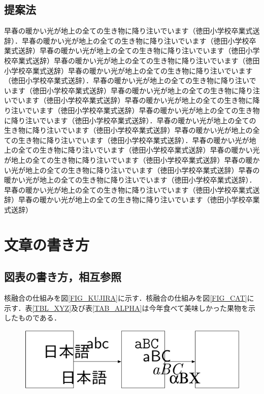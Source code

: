 \begin{multicols*}{2}
\subsection{提案法}
早春の暖かい光が地上の全ての生き物に降り注いでいます（徳田小学校卒業式送辞）．早春の暖かい光が地上の全ての生き物に降り注いでいます（徳田小学校卒業式送辞）早春の暖かい光が地上の全ての生き物に降り注いでいます（徳田小学校卒業式送辞）早春の暖かい光が地上の全ての生き物に降り注いでいます（徳田小学校卒業式送辞）早春の暖かい光が地上の全ての生き物に降り注いでいます（徳田小学校卒業式送辞）．早春の暖かい光が地上の全ての生き物に降り注いでいます（徳田小学校卒業式送辞）早春の暖かい光が地上の全ての生き物に降り注いでいます（徳田小学校卒業式送辞）早春の暖かい光が地上の全ての生き物に降り注いでいます（徳田小学校卒業式送辞）早春の暖かい光が地上の全ての生き物に降り注いでいます（徳田小学校卒業式送辞）．早春の暖かい光が地上の全ての生き物に降り注いでいます（徳田小学校卒業式送辞）早春の暖かい光が地上の全ての生き物に降り注いでいます（徳田小学校卒業式送辞）．早春の暖かい光が地上の全ての生き物に降り注いでいます（徳田小学校卒業式送辞）早春の暖かい光が地上の全ての生き物に降り注いでいます（徳田小学校卒業式送辞）早春の暖かい光が地上の全ての生き物に降り注いでいます（徳田小学校卒業式送辞）早春の暖かい光が地上の全ての生き物に降り注いでいます（徳田小学校卒業式送辞）．早春の暖かい光が地上の全ての生き物に降り注いでいます（徳田小学校卒業式送辞）早春の暖かい光が地上の全ての生き物に降り注いでいます（徳田小学校卒業式送辞）
\section{文章の書き方}
\subsection{図表の書き方，相互参照}
核融合の仕組みを図\ref{FIG_KUJIRA}に示す\cite{jp2k1,bk1}．核融合の仕組みを図\ref{FIG_CAT}に示す．表\ref{TBL_XYZ}及び表\ref{TAB_ALPHA}は今年食べて美味しかった果物を示したものである\cite{sdkguide}．

\begin{figure} %
	\centering
	\includegraphics[width=\linewidth]{fig/concept.pdf}
\end{figure}


\end{multicols*}
